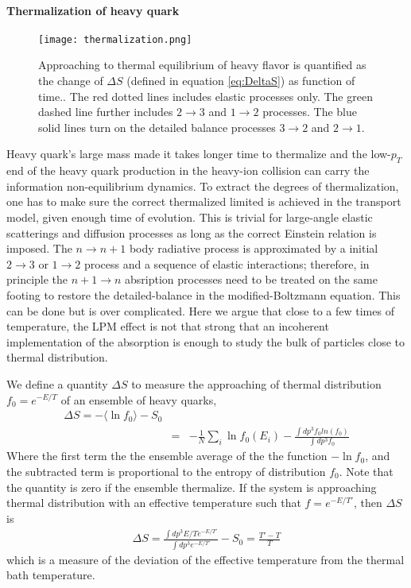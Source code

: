 \paragraph{Thermalization of heavy quark}
\begin{figure}
\centering
\texttt{[image: thermalization.png]}
\caption{Approaching to thermal equilibrium of heavy flavor is quantified as the change of $\Delta S$ (defined in equation \ref{eq:DeltaS}) as function of time.. The red dotted lines includes elastic processes only. The green dashed line further includes $2\rightarrow 3$ and $1\rightarrow 2$ processes. The blue solid lines turn on the detailed balance processes $3\rightarrow 2$ and $2\rightarrow 1$.}
\label{fig:thermalization}
\end{figure}
Heavy quark's large mass made it takes longer time to thermalize and the low-$p_T$ end of the heavy quark production in the heavy-ion collision can carry the information non-equilibrium dynamics.
To extract the degrees of thermalization, one has to make sure the correct thermalized limited is achieved in the transport model, given enough time of evolution.
This is trivial for large-angle elastic scatterings and diffusion processes as long as the correct Einstein relation is imposed.
The $n\rightarrow n+1$ body radiative process is approximated by a initial $2\rightarrow 3$ or $1\rightarrow 2$ process and a sequence of elastic interactions; therefore, in principle the $n+1\rightarrow n$ absription processes need to be treated on the same footing to restore the detailed-balance in the modified-Boltzmann equation.
This can be done but is over complicated.
Here we argue that close to a few times of temperature, the LPM effect is not that strong that an incoherent implementation of the absorption is enough to study the bulk of particles close to thermal distribution.

We define a quantity $\Delta S$ to measure the approaching of thermal distribution $f_0 = e^{-E/T}$ of an ensemble of heavy quarks,
\begin{eqnarray}
\Delta S = - \langle \ln f_0 \rangle - S_0 \\
 &=& - \frac{1}{N}\sum_i\ln f_0(E_i) - \frac{\int dp^3 f_0 ln(f_0)}{\int dp^3 f_0}
 \label{eq:DeltaS}
\end{eqnarray}
Where the first term the the ensemble average of the the function $-\ln f_0$, and the subtracted term is proportional to the entropy of distribution $f_0$.
Note that the quantity is zero if the ensemble thermalize.
If the system is approaching thermal distribution with an effective temperature such that $f = e^{-E/T'}$, then $\Delta S$ is 
\begin{eqnarray}
\Delta S = \frac{\int dp^3 E/T e^{-E/T'}}{\int dp^3 e^{-E/T'}} - S_0 = \frac{T'-T}{T}
\end{eqnarray}
which is a measure of the deviation of the effective temperature from the thermal bath temperature.

